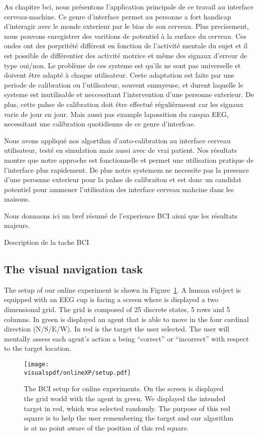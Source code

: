 Au chapitre bci, nous présentons l'application principale de ce travail au interface cerveau-machine. Ce genre d'interface permet au personne a fort handicap d'interagir avec le monde exterieur par le bias de son cerveau. Plus precisement, nous pouvons enregistrer des varitions de potentiel à la surface du cerveau. Ces ondes ont des porpritété différent en fonction de l'activité mentale du sujet et il est possible de différentier des activité motrice et même des signaux d'erreur de type oui/non. Le problème de ces systeme est qu'ils ne sont pas universelle et doivent être adapté à chaque utilisateur. Ceete adaptation est faite par une periode de calibration ou l'utilisateur, souvent ennuyeuse, et durent laquelle le systeme est inutilisable et neccessitant l'intervention d'une personne exterieur. De plus, cette pahse de calibration doit être effectué régulièrmeent car les signaux varie de jour en jour. Mais aussi pas example lapossition du casqua EEG, necessitant une calibration quotidienne de ce genre d'interfcae. 


Nous avons appliqué nos algortihm d'auto-calibration au interface cerveau utilisateur, testé en simulation mais aussi avec de vrai patient. Nos résultats montre que notre approche est fonctionnelle et permet une utilisation pratique  de l'interface plus rapidement. De plus notre systemem ne necessite pas la presence d'une perosnne exterieur pour la pahse de calibraiton et est donc un candidat potentiel pour ammener l'utilisation des interface cerveau mahcine dans les maisons.

Nous donnaons ici un bref résumé de l'experience BCI aisni que les résultats majeurs.

Description de la tache BCI

\subsection{The visual navigation task}

The setup of our online experiment is shown in Figure~\ref{fig:BCIsetup}. A human subject is equipped with an EEG cup is facing a screen where is displayed a two dimensional grid. The grid is composed of 25 discrete states, 5 rows and 5 columns. In green is displayed an agent that is able to move in the four cardinal direction (N/S/E/W). In red is the target the user selected. The user will mentally assess each agent's action a being ``correct'' or ``incorrect'' with respect to the target location.

\begin{figure}[!htbp]
\centering
\texttt{[image: \\visualspdf/onlineXP/setup.pdf]}
\caption{The BCI setup for online experiments. On the screen is displayed the grid world with the agent in green. We displayed the intended target in red, which was selected randomly. The purpose of this red square is to help the user remembering the target and our algorithm is at no point aware of the position of this red square.}
\label{fig:BCIsetup}
\end{figure}

